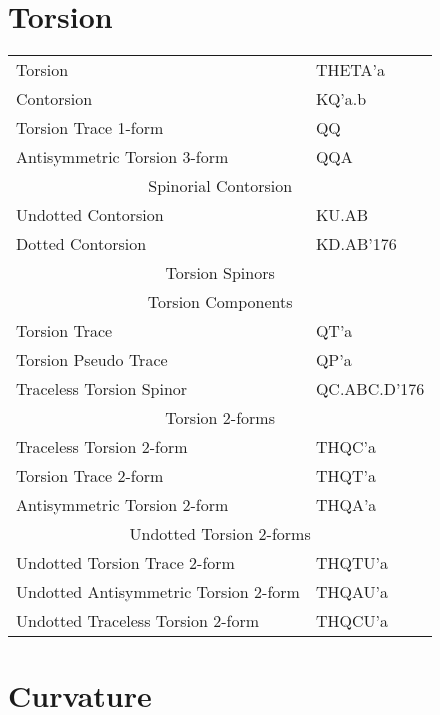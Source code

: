 \documentclass[twoside,openright]{report}
\newcommand{\grgtt}{\ttfamily}
\renewcommand{\tt}{\grgtt}
\newcommand{\cc}{{\tt \char'176}}           %
\begin{document}
\begin{center}
\section{Torsion}
\begin{tabular}{|l|l|}\hline
\tt    Torsion    &\tt  THETA'a\\
\tt    Contorsion &\tt  KQ'a.b\\
\tt    Torsion Trace 1-form         &\tt   QQ\\
\tt    Antisymmetric Torsion 3-form &\tt  QQA\\
\hline
\multicolumn{2}{|c|}{\tt Spinorial Contorsion}\\
\tt    Undotted Contorsion   &\tt  KU.AB\\
\tt    Dotted Contorsion     &\tt  KD.AB\cc\\
\hline
\multicolumn{2}{|c|}{\tt    Torsion Spinors    }\\
\multicolumn{2}{|c|}{\tt    Torsion Components }\\
\tt    Torsion Trace               &\tt    QT'a\\
\tt    Torsion Pseudo Trace        &\tt    QP'a\\
\tt    Traceless Torsion Spinor    &\tt    QC.ABC.D\cc\\
\hline
\multicolumn{2}{|c|}{\tt    Torsion 2-forms}\\
\tt    Traceless Torsion 2-form     &\tt   THQC'a\\
\tt    Torsion Trace 2-form         &\tt   THQT'a\\
\tt    Antisymmetric Torsion 2-form &\tt   THQA'a\\
\hline
\multicolumn{2}{|c|}{\tt    Undotted Torsion 2-forms}\\
\tt    Undotted Torsion Trace 2-form         &\tt   THQTU'a\\
\tt    Undotted Antisymmetric Torsion 2-form &\tt   THQAU'a\\
\tt    Undotted Traceless Torsion 2-form     &\tt   THQCU'a\\
\hline\end{tabular}


\section{Curvature}


\end{center}
\end{document}

